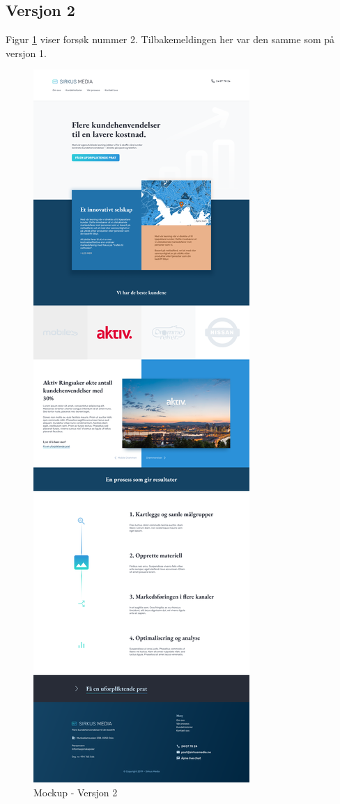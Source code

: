 \subsection{Versjon 2}
Figur \ref{fig:mockup-v2} viser forsøk nummer 2. Tilbakemeldingen her var den samme som på versjon 1.
\begin{figure}[H]
    \centering
    \includegraphics[height=.85\textheight]{mockup2-draft3.png}
    \caption{Mockup - Versjon 2}
    \label{fig:mockup-v2}
\end{figure}

